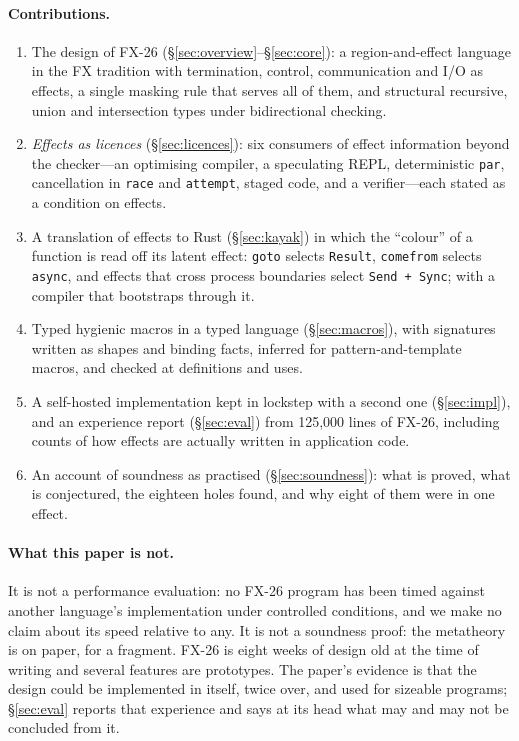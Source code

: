 \documentclass[acmsmall,screen,review]{acmart}
\newcommand{\cd}[1]{\texttt{#1}}
\newcommand{\fx}{FX-26}
\begin{document}
\paragraph{Contributions.}
\begin{enumerate}
\item The design of \fx{} (\S\ref{sec:overview}--\S\ref{sec:core}): a
  region-and-effect language in the FX tradition with termination,
  control, communication and I/O as effects, a single masking rule that
  serves all of them, and structural recursive, union and intersection
  types under bidirectional checking.
\item \emph{Effects as licences} (\S\ref{sec:licences}): six consumers
  of effect information beyond the checker---an optimising compiler,
  a speculating REPL, deterministic \cd{par}, cancellation in \cd{race}
  and \cd{attempt}, staged code, and a verifier---each stated as a
  condition on effects.
\item A translation of effects to Rust (\S\ref{sec:kayak}) in which the
  ``colour'' of a function is read off its latent effect: \cd{goto}
  selects \cd{Result}, \cd{comefrom} selects \cd{async}, and effects that
  cross process boundaries select \cd{Send + Sync}; with a compiler
  that bootstraps through it.
\item Typed hygienic macros in a typed language (\S\ref{sec:macros}),
  with signatures written as shapes and binding facts, inferred for pattern-and-template macros, and checked at definitions and uses.
\item A self-hosted implementation kept in lockstep with a second one
  (\S\ref{sec:impl}), and an experience report (\S\ref{sec:eval}) from 125,000
  lines of \fx{}, including counts of how effects are actually
  written in application code.
\item An account of soundness as practised (\S\ref{sec:soundness}): what
  is proved, what is conjectured, the eighteen holes found, and why
  eight of them were in one effect.
\end{enumerate}

\paragraph{What this paper is not.} It is not a performance
evaluation: no \fx{} program has been timed against another language's
implementation under controlled conditions, and we make no claim about
its speed relative to any. It is not a soundness proof: the metatheory
is on paper, for a fragment. \fx{} is eight weeks of design old at the
time of writing and several features are prototypes. The paper's
evidence is that the design could be implemented in itself, twice
over, and used for sizeable programs; \S\ref{sec:eval} reports that
experience and says at its head what may and may not be concluded
from it.
\end{document}
